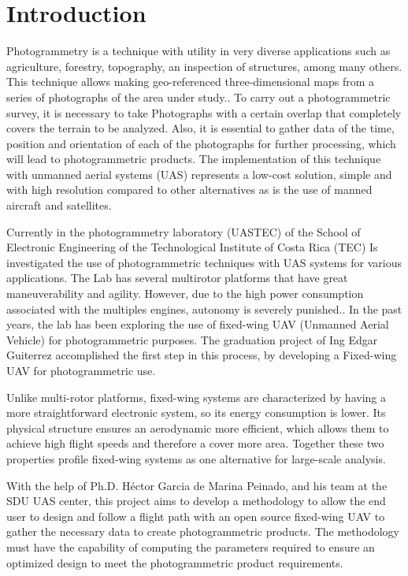 \section{Introduction}
Photogrammetry is a technique with utility in very diverse applications such as agriculture,
forestry, topography, an inspection of structures, among many others. This technique allows making geo-referenced three-dimensional maps from a series of photographs of the
area under study.\cite{Articulo}. To carry out a photogrammetric survey, it is necessary to take
Photographs with a certain overlap that completely covers the terrain to be analyzed. Also, it is essential to gather data of the time, position and orientation of each of the photographs for further processing, which will lead to photogrammetric products. The implementation of this technique with unmanned aerial systems (UAS) represents a low-cost solution, simple and with high resolution compared to other alternatives as is the use of manned aircraft and satellites.\cite{FotogrametryThesis}

Currently in the photogrammetry laboratory (UASTEC) of the School of Electronic Engineering of the Technological Institute of Costa Rica (TEC) Is investigated the use of photogrammetric techniques with UAS systems for various applications. The Lab has several multirotor platforms that have great maneuverability and agility. However, due to the high power consumption associated with the multiples engines, autonomy is severely punished.\cite{Leonardo}. In the past years, the lab has been exploring the use of fixed-wing UAV (Unmanned Aerial Vehicle) for photogrammetric purposes. The graduation project of Ing  Edgar Guiterrez accomplished the first step in this process, by developing a Fixed-wing UAV for photogrammetric use.\cite{Edgar}

Unlike multi-rotor platforms, fixed-wing systems are characterized by having a more straightforward electronic system, so its energy consumption is lower. Its physical structure ensures an aerodynamic
more efficient, which allows them to achieve high flight speeds and therefore a cover more area. Together these two properties profile fixed-wing systems as one alternative for large-scale analysis.

With the help of Ph.D. Héctor Garcia de Marina Peinado, and  his team at the SDU UAS center, this project aims to develop a methodology to allow the end user to design and follow a flight path with an open source fixed-wing UAV to gather the necessary data to create photogrammetric products. The methodology must have the capability of computing the parameters required to ensure an optimized design to meet the photogrammetric product requirements.

